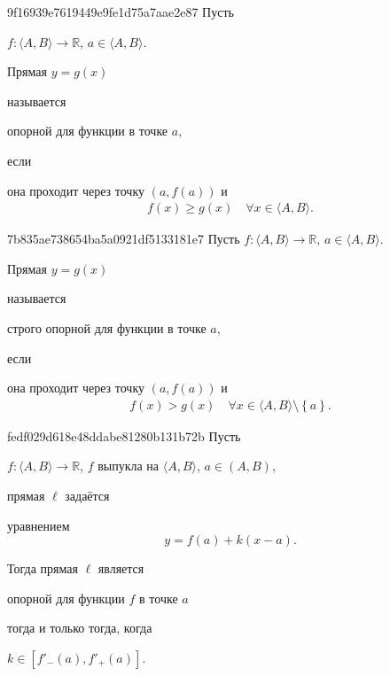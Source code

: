 \begin{note}{9f16939e7619449e9fe1d75a7aae2e87}
    Пусть \begin{icloze}{3}\( f : \langle A, B \rangle \to \mathbb R  \), \( a \in \langle A, B \rangle  \).\end{icloze}
    \begin{icloze}{2}Прямая \( y = g(x) \)\end{icloze} называется \begin{icloze}{1}опорной для функции в точке \( a \),\end{icloze} если
    \begin{icloze}{2}
        она проходит через точку \( (a, f(a)) \) и
        \[
            \begin{gathered}
                f(x) \geqslant g(x) \quad \forall x \in \langle A, B \rangle.
            \end{gathered}
        \]
    \end{icloze}
\end{note}

\begin{note}{7b835ae738654ba5a0921df5133181e7}
    Пусть \( f : \langle A, B \rangle \to \mathbb R  \), \( a \in \langle A, B \rangle  \).
    \begin{icloze}{2}Прямая \( y = g(x) \)\end{icloze} называется \begin{icloze}{1}строго опорной для функции в точке \( a \),\end{icloze} если
    \begin{icloze}{2}
        она проходит через точку \( (a, f(a)) \) и
        \[
            \begin{gathered}
                f(x) > g(x) \quad \forall x \in \langle A, B \rangle \setminus \left\{ a \right\}.
            \end{gathered}
        \]
    \end{icloze}
\end{note}

\begin{note}{fedf029d618e48ddabe81280b131b72b}
    Пусть \begin{icloze}{5}\( f : \langle A, B \rangle \to \mathbb R  \), \( f \) выпукла на \( \langle A, B \rangle  \), \( a \in (A, B) \),\end{icloze} прямая \( \ell \) задаётся
    \begin{icloze}{4}
        уравнением
        \[
            y = f(a) + k(x - a).
        \]
    \end{icloze}

    Тогда прямая \( \ell  \) является \begin{icloze}{1}опорной для функции \( f \)
    в точке \( a \)\end{icloze} \begin{icloze}{3}тогда и только тогда, когда\end{icloze}
    \begin{icloze}{2}
        \( k \in [f'_-(a), f'_+(a)] \).
    \end{icloze}
\end{note}

